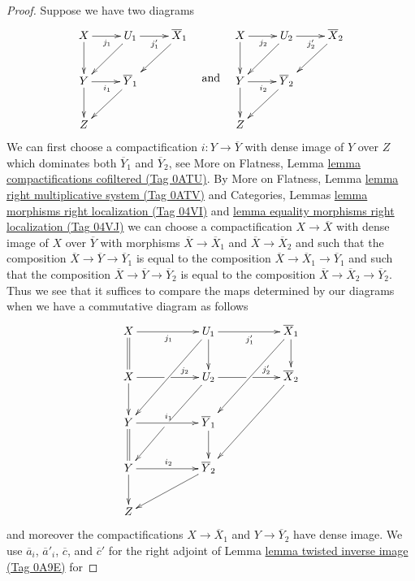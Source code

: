 \documentclass{amsart}
\theoremstyle{plain}
\theoremstyle{definition}
\theoremstyle{remark}
\numberwithin{equation}{subsection}
\begin{document}
\begin{proof}
\medskip\noindent
Suppose we have two diagrams
$$
\vcenter{
\xymatrix{
X \ar[r]_{j_1} \ar[d] & U_1 \ar[dl] \ar[r]_{j'_1} & \overline{X}_1 \ar[dl] \\
Y \ar[r]_{i_1} \ar[d] & \overline{Y}_1 \ar[dl] \\
Z
}
}
\quad\text{and}\quad
\vcenter{
\xymatrix{
X \ar[r]_{j_2} \ar[d] & U_2 \ar[dl] \ar[r]_{j'_2} & \overline{X}_2 \ar[dl] \\
Y \ar[r]_{i_2} \ar[d] & \overline{Y}_2 \ar[dl] \\
Z
}
}
$$
We can first choose a compactification $i : Y \to \overline{Y}$
with dense image of $Y$ over $Z$ which dominates both
$\overline{Y}_1$ and $\overline{Y}_2$,
see More on Flatness, Lemma \href{https://stacks.math.columbia.edu/tag/0ATU}{lemma compactifications cofiltered (Tag 0ATU)}.
By More on Flatness, Lemma \href{https://stacks.math.columbia.edu/tag/0ATV}{lemma right multiplicative system (Tag 0ATV)} and
Categories, Lemmas \href{https://stacks.math.columbia.edu/tag/04VI}{lemma morphisms right localization (Tag 04VI)} and
\href{https://stacks.math.columbia.edu/tag/04VJ}{lemma equality morphisms right localization (Tag 04VJ)}
we can choose a compactification $X \to \overline{X}$ with dense image of
$X$ over $\overline{Y}$ with morphisms $\overline{X} \to \overline{X}_1$
and $\overline{X} \to \overline{X}_2$ and such that the composition
$\overline{X} \to \overline{Y} \to \overline{Y}_1$ is equal to
the composition $\overline{X} \to \overline{X}_1 \to \overline{Y}_1$
and such that the composition
$\overline{X} \to \overline{Y} \to \overline{Y}_2$ is equal to
the composition $\overline{X} \to \overline{X}_2 \to \overline{Y}_2$.
Thus we see that it suffices to compare the maps
determined by our diagrams when we have a commutative diagram
as follows
$$
\xymatrix{
X \ar[rr]_{j_1} \ar@{=}[d] & &
U_1 \ar[d] \ar[ddll] \ar[rr]_{j'_1} & &
\overline{X}_1 \ar[d] \ar[ddll] \\
X \ar'[r][rr]^-{j_2} \ar[d] & &
U_2 \ar'[dl][ddll] \ar'[r][rr]^-{j'_2} & &
\overline{X}_2 \ar[ddll] \\
Y \ar[rr]^{i_1} \ar@{=}[d] & & \overline{Y}_1 \ar[d] \\
Y \ar[rr]^{i_2} \ar[d] & & \overline{Y}_2 \ar[dll] \\
Z
}
$$
and moreover the compactifications $X \to \overline{X}_1$ and
$Y \to \overline{Y}_2$ have dense image.
We use $\overline{a}_i$, $\overline{a}'_i$, $\overline{c}$, and
$\overline{c}'$ for the
right adjoint of Lemma \href{https://stacks.math.columbia.edu/tag/0A9E}{lemma twisted inverse image (Tag 0A9E)} for

\end{proof}
\end{document}
